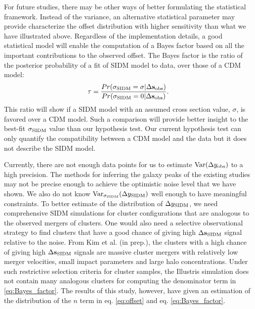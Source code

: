 For future studies, there may be other ways of better formulating the
statistical framework.
Instead of the variance, an alternative statistical parameter 
may provide characterize the offset distribution with 
higher sensitivity than what we have illustrated above.
Regardless of the implementation details,
a good statistical model will enable the computation of a Bayes factor based
on all the important contributions to the observed offset.
The Bayes factor is the ratio of the posterior probability of a fit of SIDM model to data,
over those of a CDM model:
\begin{equation}
	\tau = \frac{Pr(\sigma_{{\rm SIDM}} = \sigma | \Delta {\bf s}_{\rm
	obs})}{Pr(\sigma_{{\rm SIDM}} = 0 | \Delta {\bf s}_{\rm obs})}.
	\label{eq:Bayes_factor}
\end{equation}
This ratio will show if a SIDM model with an assumed cross section value, $\sigma$,
is favored over a CDM model. Such a comparison will provide better
insight to the best-fit $\sigma_{\rm SIDM}$ value than our hypothesis test.
Our current hypothesis test can only quantify the compatibility between a CDM
model and the data but it does not describe the SIDM model. 

Currently, there are not enough data points for us to estimate 
$\mathrm{Var}(\Delta y_{\rm obs})$ to a high precision. The methods for inferring 
the galaxy peaks of the existing studies may not be precise enough to 
achieve the optimistic noise level that we have shown. 
We also do not know $\mathrm{Var}_{\sigma_{\rm SIDM}}(\Delta y_{\rm SIDM})$ well enough
to have meaningful constraints. 
To better estimate of the distribution 
of $\Delta y_{\rm SIDM}$, we need comprehensive SIDM simulations 
for cluster configurations that are
analogous to the observed mergers of clusters. 
One would also need a selective observational strategy
to find clusters that have a good chance of giving high $\Delta {\bf s}_{\rm SIDM}$ signal
relative to the noise.  
From Kim et al. (in prep.), the clusters with a high chance of giving high
$\Delta {\bf s}_{\rm SIDM}$ signals are massive cluster mergers with relatively low merger
velocities, small impact parameters and large halo concentrations.
Under such restrictive selection criteria for cluster samples, 
the Illustris simulation does not contain 
many analogous clusters for computing the denominator term in
\ref{eq:Bayes_factor}.
The results of this study, however,
have given an estimation of the distribution of the $n$ term in
eq. \ref{eq:offset} and eq. \ref{eq:Bayes_factor}.  


